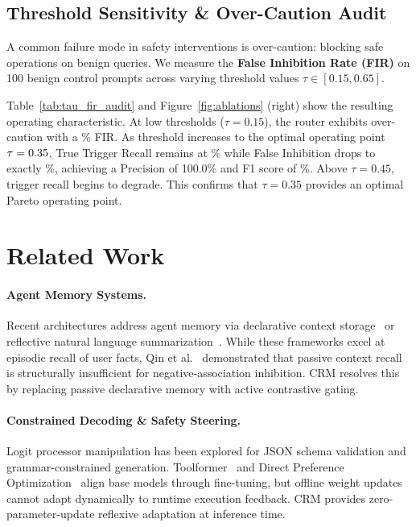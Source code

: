 \documentclass[10pt,conference]{IEEEtran}
\begin{document}


\subsection{Threshold Sensitivity \& Over-Caution Audit}

A common failure mode in safety interventions is over-caution: blocking safe operations on benign queries. We measure the \textbf{False Inhibition Rate (FIR)} on 100 benign control prompts across varying threshold values $\tau \in [0.15, 0.65]$.

Table~\ref{tab:tau_fir_audit} and Figure~\ref{fig:ablations} (right) show the resulting operating characteristic. At low thresholds ($\tau = 0.15$), the router exhibits over-caution with a \ValOptimalTauFIR\% FIR. As threshold increases to the optimal operating point $\tau = 0.35$, True Trigger Recall remains at \ValOptimalTauRecall\% while False Inhibition drops to exactly \ValOptimalTauFIR\%, achieving a Precision of 100.0\% and F1 score of \ValOptimalTauFOne\%. Above $\tau = 0.45$, trigger recall begins to degrade. This confirms that $\tau = 0.35$ provides an optimal Pareto operating point.



\section{Related Work}

\paragraph{Agent Memory Systems.}
Recent architectures address agent memory via declarative context storage~\cite{packer2023memgpt,chhikara2024mem0} or reflective natural language summarization~\cite{shinn2023reflexion}. While these frameworks excel at episodic recall of user facts, Qin et al.~\cite{qin2026implicitmembench} demonstrated that passive context recall is structurally insufficient for negative-association inhibition. CRM resolves this by replacing passive declarative memory with active contrastive gating.

\paragraph{Constrained Decoding \& Safety Steering.}
Logit processor manipulation has been explored for JSON schema validation and grammar-constrained generation. Toolformer~\cite{schick2023toolformer} and Direct Preference Optimization~\cite{rafailov2023direct} align base models through fine-tuning, but offline weight updates cannot adapt dynamically to runtime execution feedback. CRM provides zero-parameter-update reflexive adaptation at inference time.
\end{document}
